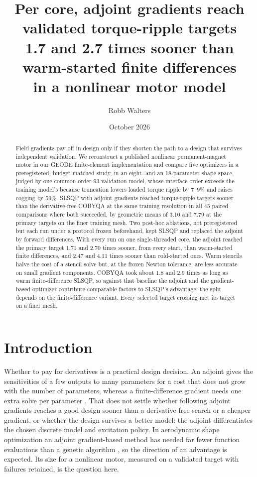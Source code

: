 \documentclass{anvil-paper}
\title{Per core, adjoint gradients reach validated torque-ripple targets\\
1.7 and 2.7 times sooner than warm-started finite differences\\in a nonlinear motor model}
\author{Robb Walters}
\date{October 2026}
\begin{document}
\maketitle
\begin{abstract}
Field gradients pay off in design only if they shorten the path to a
design that survives independent validation. We reconstruct a published
nonlinear permanent-magnet motor in our GEODE finite-element
implementation and compare five optimizers in a preregistered,
budget-matched study, in an eight- and an 18-parameter shape space, judged
by one common order-93 validation model, whose interface order exceeds the
training model's because truncation lowers loaded torque ripple by 7--9\%
and raises cogging by 59\%. SLSQP with adjoint gradients reached
torque-ripple targets sooner than the derivative-free COBYQA at the same
training resolution in all 45 paired comparisons where both succeeded, by
geometric means of 3.10 and 7.79 at the primary targets on the finer
training mesh. Two post-hoc ablations, not preregistered but each run under
a protocol frozen beforehand, kept SLSQP and replaced the adjoint by forward differences.
With every run on one single-threaded core, the adjoint reached the primary
target 1.71 and 2.70 times sooner, from every start, than warm-started
finite differences, and 2.47 and 4.11 times sooner than cold-started ones.
Warm stencils halve the cost of a stencil solve but, at the frozen Newton
tolerance, are less accurate on small gradient components. COBYQA took
about 1.8 and 2.9 times as long as warm finite-difference SLSQP, so against
that baseline the adjoint and the gradient-based optimizer contribute
comparable factors to SLSQP's advantage; the split depends on the
finite-difference variant. Every selected target crossing met its target on
a finer mesh.
\end{abstract}

\section{Introduction}
Whether to pay for derivatives is a practical design decision. An adjoint
gives the sensitivities of a few outputs to many parameters for a cost
that does not grow with the number of parameters, whereas a
finite-difference gradient needs one extra solve per parameter
\citep{giles2000introduction,martins2013review}. That does not settle
whether following adjoint gradients reaches a good design sooner than a
derivative-free search or a cheaper gradient, or whether the design
survives a better model: the adjoint differentiates the chosen discrete
model and excitation policy. In aerodynamic shape optimization an adjoint
gradient-based method has needed far fewer function evaluations than a
genetic algorithm \citep{zingg2008comparative}, so the direction of an
advantage is expected. Its size for a nonlinear motor, measured on a
validated target with failures retained, is the question here.
\end{document}

